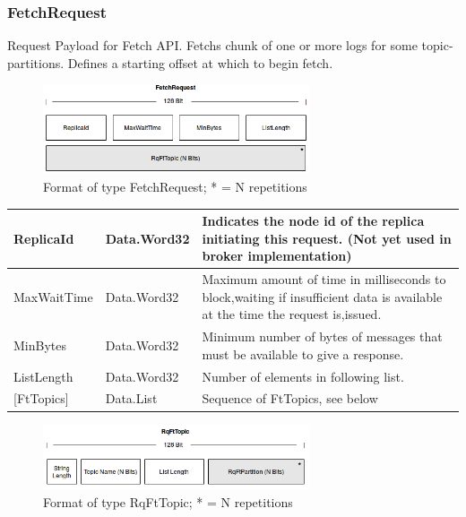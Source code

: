 \subsubsection{FetchRequest}
Request Payload for Fetch API. Fetchs chunk of one or more logs for some
topic-partitions. Defines a starting offset at which to begin fetch. 

\begin{figure}[H]
    \centering
    \includegraphics[width=0.7\textwidth]{images/impl-prot-types-fetchRequest.png}
    \caption{Format of type FetchRequest; * = N repetitions }
    \label{fig:impl-prot-types-fetchRequest}
\end{figure}

\begin{table}[H]
\centering
\begin{tabular}{ l  l  p{11cm} }
\hline
ReplicaId      & Data.Word32 & Indicates the node id of the replica initiating this request. (Not yet used in broker implementation)                        \\ \hline
MaxWaitTime    & Data.Word32 & Maximum amount of time in milliseconds to block,waiting if insufficient data is available at the time the request is,issued. \\ \hline
MinBytes       & Data.Word32 & Minimum number of bytes of messages that must be available to give a response.                                               \\ \hline
ListLength     & Data.Word32 & Number of elements in following list.                                                                                        \\ \hline
{[}FtTopics{]} & Data.List   & Sequence of FtTopics, see below                                                                                              \\ \hline
\end{tabular}
\end{table}

\begin{figure}[H]
    \centering
    \includegraphics[width=0.7\textwidth]{images/impl-prot-types-ftTopic.png}
    \caption{Format of type RqFtTopic; * = N repetitions }
    \label{fig:impl-prot-types-ftTopic}
\end{figure}

